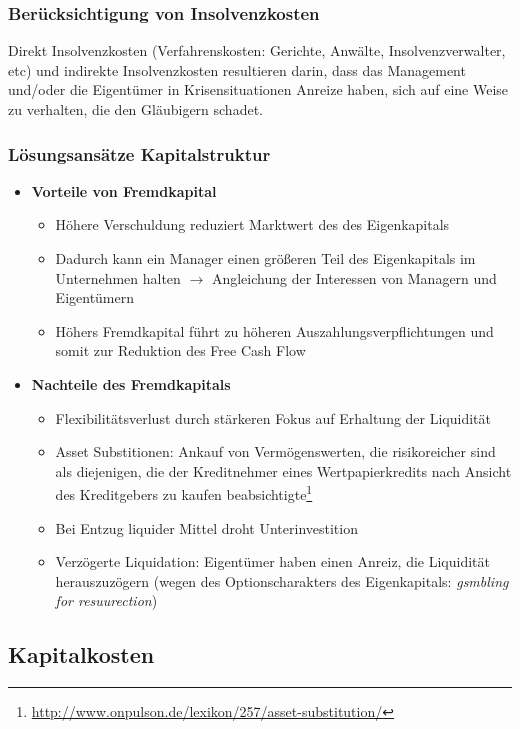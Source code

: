 \subsubsection{Berücksichtigung von Insolvenzkosten}
Direkt Insolvenzkosten (Verfahrenskosten: Gerichte, Anwälte, Insolvenzverwalter, etc) und indirekte Insolvenzkosten resultieren darin, dass das Management und/oder die Eigentümer in Krisensituationen Anreize haben, sich auf eine Weise zu verhalten, die den Gläubigern schadet.

\subsubsection{Lösungsansätze Kapitalstruktur}
\begin{itemize}
	\item \textbf{Vorteile von Fremdkapital}
	\begin{itemize}
		\item Höhere Verschuldung reduziert Marktwert des des Eigenkapitals
		\item Dadurch kann ein Manager einen größeren Teil des Eigenkapitals im Unternehmen halten $\rightarrow$ Angleichung der Interessen von Managern und Eigentümern
		\item Höhers Fremdkapital führt zu höheren Auszahlungsverpflichtungen und somit zur Reduktion des Free Cash Flow
	\end{itemize}
	\item \textbf{Nachteile des Fremdkapitals}
	\begin{itemize}
		\item Flexibilitätsverlust durch stärkeren Fokus auf Erhaltung der Liquidität
		\item Asset Substitionen: Ankauf von Vermögenswerten, die risikoreicher sind als diejenigen, die der Kreditnehmer eines Wertpapierkredits nach Ansicht des Kreditgebers zu kaufen beabsichtigte\footnote{\url{http://www.onpulson.de/lexikon/257/asset-substitution/}}
		\item Bei Entzug liquider Mittel droht Unterinvestition
		\item Verzögerte Liquidation: Eigentümer haben einen Anreiz, die Liquidität herauszuzögern (wegen des Optionscharakters des Eigenkapitals: \textit{gsmbling for resuurection})
	\end{itemize}
\end{itemize}


\subsection{Kapitalkosten}

